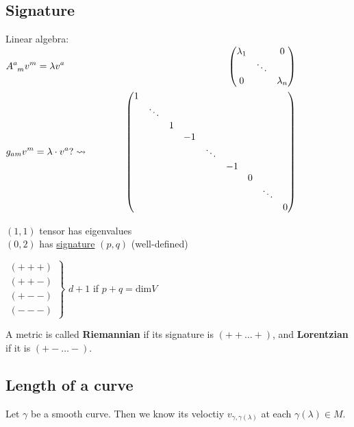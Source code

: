 \subsection{Signature}
Linear algebra: \quad \quad \, $\begin{aligned} & A\indices{^a_{m}}v^m = \lambda v^a & \quad \quad \quad \, \left(\begin{matrix} \lambda_1 & & 0 \\
    & \ddots & \\ 
    0 & & \lambda_n \end{matrix} \right) \\
  & g_{am} v^m = \lambda \cdot v^a ? \rightsquigarrow  & \quad \quad \quad \, \left( \begin{matrix} 
    1        &   &    &        &    &   &        & \\
    & \ddots &   &    &        &    &   &        & \\
    &        & 1 &    &        &    &   &        & \\
    &        &   & -1 &        &    &   &        & \\
    &        &   &    & \ddots &    &   &        & \\
    &        &   &    &        & -1 &   &        & \\
    &        &   &    &        &    & 0 &        & \\
    &        &   &    &        &    &   & \ddots & \\
    &        &   &    &        &    &   &        & 0 \end{matrix} \right)
\end{aligned}$

$(1,1)$ tensor has eigenvalues \\
$(0,2)$ has \underline{signature} $(p,q)$ (well-defined)

$\left. \begin{aligned}
  (+++) \\
  (++-) \\
  (+--) \\
  (---) \end{aligned} \right\rbrace$ $d+1$ if $p+q = \text{dim}V$

\begin{definition} A metric is called \textbf{Riemannian} if its signature is $(++ \dots +)$, and \textbf{Lorentzian} if it is $(+-\dots -)$.
\end{definition}

\subsection{Length of a curve}
Let $\gamma$ be a smooth curve. Then we know its veloctiy $v_{\gamma,\gamma(\lambda)}$ at each $\gamma(\lambda) \in M$.


